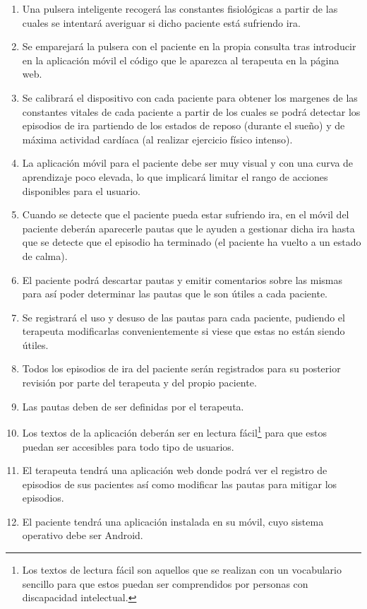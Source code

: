 \begin{enumerate}
    \item Una pulsera inteligente recogerá las constantes fisiológicas a partir de las cuales se intentará averiguar si dicho paciente está sufriendo ira.
    \item Se emparejará la pulsera con el paciente en la propia consulta tras introducir en la aplicación móvil el código que le aparezca al terapeuta en la página web.
    \item Se calibrará el dispositivo con cada paciente para obtener los margenes de las constantes vitales de cada paciente a partir de los cuales se podrá detectar los episodios de ira partiendo de los estados de reposo (durante el sueño) y de máxima actividad cardíaca (al realizar ejercicio físico intenso).
    \item La aplicación móvil para el paciente debe ser muy visual y con una curva de aprendizaje poco elevada, lo que implicará limitar el rango de acciones disponibles para el usuario.
    \item Cuando se detecte que el paciente pueda estar sufriendo ira, en el móvil del paciente deberán aparecerle pautas que le ayuden a gestionar dicha ira hasta que se detecte que el episodio ha terminado (el paciente ha vuelto a un estado de calma).
    \item El paciente podrá descartar pautas y emitir comentarios sobre las mismas para así poder determinar las pautas que le son útiles a cada paciente.
    \item Se registrará el uso y desuso de las pautas para cada paciente, pudiendo el terapeuta modificarlas convenientemente si viese que estas no están siendo útiles.
    \item Todos los episodios de ira del paciente serán registrados para su posterior revisión por parte del terapeuta y del propio paciente.
    \item Las pautas deben de ser definidas por el terapeuta.
    \item Los textos de la aplicación deberán ser en lectura fácil\footnote{Los textos de lectura fácil son aquellos que se realizan con un vocabulario sencillo para que estos puedan ser comprendidos por personas con discapacidad intelectual.} para que estos puedan ser accesibles para todo tipo de usuarios.
    \item El terapeuta tendrá una aplicación web donde podrá ver el registro de episodios de sus pacientes así como modificar las pautas para mitigar los episodios.
    \item El paciente tendrá una aplicación instalada en su móvil, cuyo sistema operativo debe ser Android.
\end{enumerate}

